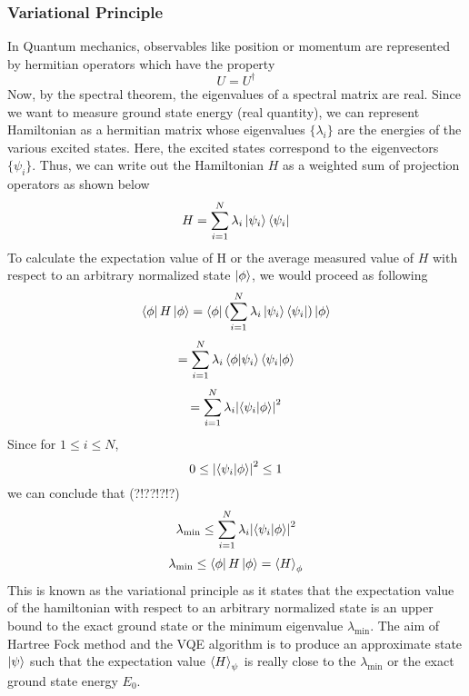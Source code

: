 \documentclass{article}
\begin{document}
      \subsubsection{Variational Principle}
        In Quantum mechanics, observables like position or momentum are
        represented by hermitian operators which have the property
        \[U = U^{\dagger}\]
        Now, by the spectral theorem, the eigenvalues of a spectral matrix
        are real. Since we want to measure ground state energy (real quantity),
        we can represent Hamiltonian as a hermitian matrix whose eigenvalues
        \(\{\lambda_i\}\)
        are the energies of the various excited states. Here, the excited states
        correspond to the eigenvectors \(\{\psi_i\}\). Thus, we can write out
        the Hamiltonian \(H\) as a weighted sum of projection operators as shown
        below
        \[H = \sum_{i = 1}^{N} \lambda_i\ket{\psi_i}\bra{\psi_i}\]
        To calculate the expectation value of H or the average
        measured value of \(H\) with respect to an arbitrary
        normalized state \(\ket{\phi}\), we would proceed as following
        \[\bra{\phi}H\ket{\phi} = \bra{\phi}(\sum_{i = 1}^{N} \lambda_i\ket{\psi_i}\bra{\psi_i})\ket{\phi}\]
        \[ = \sum_{i = 1}^{N}\lambda_i\bra{\phi}\ket{\psi_i}\bra{\psi_i}\ket{\phi}\]
        \[ = \sum_{i = 1}^{N}\lambda_i\abs{\bra{\psi_i}\ket{\phi}}^2\]
        Since for \(1 \leq i \leq N\),
        \[0 \leq \abs{\bra{\psi_i}\ket{\phi}}^2 \leq1\]
        we can conclude that (?!??!?!?)
        \[\lambda_{\text{min}} \leq \sum_{i = 1}^{N}\lambda_i\abs{\bra{\psi_i}\ket{\phi}}^2\]
        \[\lambda_{\text{min}} \leq\bra{\phi}H\ket{\phi} = \expval{H}_{\phi}\]
        This is known as the variational principle as it states that the expectation
        value of the hamiltonian with respect to an arbitrary normalized state is an upper bound to
        the exact ground state or the minimum eigenvalue \(\lambda_{\text{min}}\).
        The aim of Hartree Fock method and the VQE algorithm is to produce an approximate state \(\ket{\psi}\)
        such that the expectation value \(\expval{H}_{\psi}\) is really close to
        the \(\lambda_{\text{min}}\) or the exact ground state energy \(E_0\).
\end{document}
